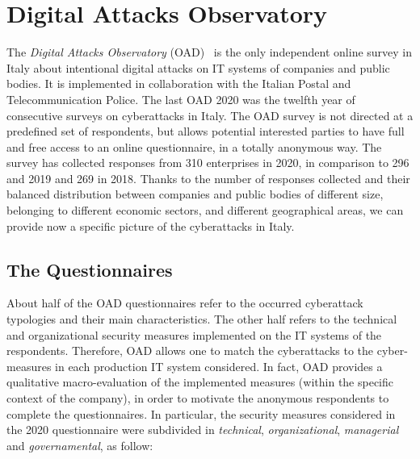 \documentclass{easychair}
\begin{document}
\section{Digital Attacks Observatory}\label{sec:DigitalAttacksObservatory}

The \textit{Digital Attacks Observatory} (OAD)~\cite{oadweb} is the only independent online survey in Italy about intentional digital attacks on IT systems of companies and public
bodies. It is implemented in collaboration with the Italian Postal and Telecommunication Police.
The last OAD 2020 was the twelfth year of consecutive surveys on cyberattacks in Italy.
The OAD survey is not directed at a predefined set of respondents, but allows potential interested
parties to have full and free access to an online questionnaire, in a totally anonymous way.
The survey has collected responses from 310 enterprises in 2020, in comparison
to 296 and 2019 and 269 in 2018. Thanks to the number of responses collected and their balanced 
distribution between companies and public bodies of different size, belonging to different economic
sectors, and different geographical areas, we can provide now a specific picture
 of the cyberattacks in Italy.

\subsection{The Questionnaires}

About half of the OAD questionnaires refer to the occurred
cyberattack typologies and their main characteristics.
The other half refers to the technical and organizational security measures implemented
on the IT systems of the respondents. 
Therefore, OAD allows one to match the cyberattacks to the cyber-measures in each production
IT system considered. 
In fact, OAD provides a qualitative macro-evaluation of the implemented measures
(within the specific context of the company), in order to motivate the anonymous respondents
to complete the questionnaires.
In particular, the security measures considered in the 2020 questionnaire were subdivided
in \emph{technical}, \emph{organizational}, \emph{managerial} and \emph{governamental}, as follow:
\end{document}
